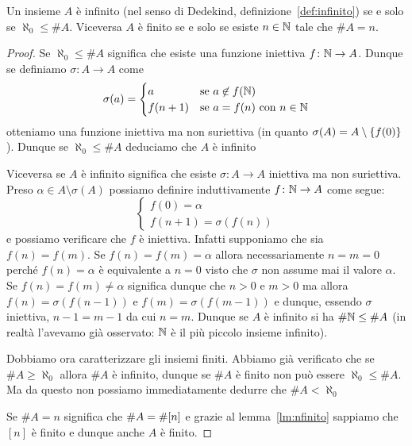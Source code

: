 \begin{theorem}
Un insieme $A$ è infinito (nel senso di Dedekind, definizione~\ref{def:infinito})
se e solo se $\aleph_0 \le \# A$.
Viceversa $A$ è finito se e solo se esiste $n\in{\mathbb N}$ tale che $\# A = n$.
\end{theorem}
%
\begin{proof}
Se $\aleph_0 \le \#A$ significa che esiste una funzione 
iniettiva $f\colon {\mathbb N}\to A$. 
Dunque se definiamo $\sigma \colon A \to A$ come
\[
\sigma(a) = \begin{cases}
  a & \text{se $a\not\in f({\mathbb N})$}\\
  f(n+1) & \text{se $a=f(n)$ con $n\in{\mathbb N}$}
\end{cases}
\]
otteniamo una funzione iniettiva ma non suriettiva 
(in quanto $\sigma(A) = A\setminus{\left\{ f(0) \right\}}$).
Dunque se $\aleph_0\le \#A$ deduciamo che $A$ è infinito

Viceversa se $A$ è infinito significa che esiste $\sigma\colon A \to A$ 
iniettiva ma non suriettiva. 
Preso $\alpha \in A \setminus\sigma(A)$
possiamo definire induttivamente $f\colon {\mathbb N}\to A$ come segue:
\[
\begin{cases}
  f(0) = \alpha\\
  f(n+1) = \sigma(f(n))
\end{cases}
\]
e possiamo verificare che $f$ è iniettiva. 
Infatti supponiamo che sia $f(n)=f(m)$.
Se $f(n)=f(m)=\alpha$ allora necessariamente $n=m=0$ 
perché $f(n)=\alpha$ è equivalente a $n=0$ visto che $\sigma$
non assume mai il valore $\alpha$.
Se $f(n)=f(m)\neq \alpha$ significa dunque che $n>0$ e $m>0$
ma allora $f(n)=\sigma(f(n-1))$ e $f(m)=\sigma(f(m-1))$
e dunque, essendo $\sigma$ iniettiva, $n-1=m-1$ da cui $n=m$. 
Dunque se $A$ è infinito si ha $\#{\mathbb N}\le \#A$
(in realtà l'avevamo già osservato: ${\mathbb N}$ è il più piccolo insieme infinito).

Dobbiamo ora caratterizzare gli insiemi finiti.
Abbiamo già verificato che se $\#A \ge \aleph_0$ 
allora $\#A$ è infinito, dunque se $\#A$ è finito 
non può essere $\aleph_0 \le \#A$.
Ma da questo non possiamo immediatamente 
dedurre che%
%
$\#A < \aleph_0$%

Se $\#A = n$ significa che $\#A = \#{\left[ n \right]}$ e 
grazie al lemma~\ref{lm:nfinito} sappiamo che $[n]$ è finito 
e dunque anche $A$ è finito.


\end{proof}
